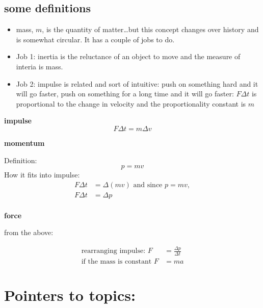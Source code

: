 \documentclass[
  letterpaper,
  DIV=11,
  numbers=noendperiod,
  oneside]{scrreprt}
\providecommand{\tightlist}{%
  \setlength{\itemsep}{0pt}\setlength{\parskip}{0pt}}\usepackage{longtable,booktabs,array}
\begin{document}
\subsection{some definitions}\label{some-definitions}

\begin{itemize}
\tightlist
\item
  mass, \(m\), is the quantity of matter\ldots but this concept changes
  over history and is somewhat circular. It has a couple of jobs to do.
\item
  Job 1: inertia is the reluctance of an object to move and the measure
  of interia is mass.
\item
  Job 2: impulse is related and sort of intuitive: push on something
  hard and it will go faster, push on something for a long time and it
  will go faster: \(F\Delta t\) is proportional to the change in
  velocity and the proportionality constant is \(m\)
\end{itemize}

\textbf{impulse} \[
\begin{equation}
F\Delta t = m\Delta v \nonumber
\end{equation}
\]

\textbf{momentum}

Definition: \[
p=mv \nonumber
\] How it fits into impulse: \[
\begin{align}
F\Delta t &= \Delta (mv) \text{ and since }p = mv, \nonumber \\
F\Delta t &= \Delta p \nonumber \\
\end{align}
\]

\textbf{force}

from the above:

\[
\begin{align}
\text{rearranging impulse: }F &= \frac{\Delta p}{\Delta t} \nonumber \\
\text{if the mass is constant } F &= ma \nonumber
\end{align}
\]

\section{Pointers to topics:}\label{pointers-to-topics-1}
\end{document}
